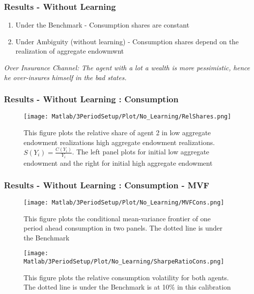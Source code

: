 \documentclass{beamer}
\theoremstyle{Definition}
\begin{document}
\begin{frame}
\frametitle{Results - Without Learning}
\begin{enumerate}	
\item Under the Benchmark - Consumption shares are constant
\item Under Ambiguity (without learning) - Consumption shares depend
  on the realization of aggregate endowmwnt

\end{enumerate}

\emph{Over Insurance Channel: The agent with a lot a wealth is more
pessimistic, hence he over-insures himself in the bad states. }

	
\end{frame}

\begin{frame}

\frametitle{Results - Without Learning : Consumption }
\begin{figure}[htbp]
\centering
	  \texttt{[image: Matlab/3PeriodSetup/Plot/No\_Learning/RelShares.png]}

	\caption{This figure plots the relative share of agent 2 in low aggregate endowment realizations high aggregate endowment realizations. $S(Y_i)=\frac{C(Y_i)}{Y_i}$. The left panel plots for initial low aggregate endowment and the right for initial high aggregate endowment}
	\label{fig:RelShares}
\end{figure}
	
\end{frame}


\begin{frame}
\frametitle{Results - Without Learning : Consumption - MVF }
\begin{figure}[htbp]
\centering
	  \texttt{[image: Matlab/3PeriodSetup/Plot/No\_Learning/MVFCons.png]}

	\caption{This figure plots the conditional mean-variance frontier of one period ahead consumption in two panels. The dotted line is under the Benchmark }
	\label{fig:MVFCons}
\end{figure}
\end{frame}
\begin{frame}
\begin{figure}[htbp]
\centering
	  \texttt{[image: Matlab/3PeriodSetup/Plot/No\_Learning/SharpeRatioCons.png]}

	\caption{This figure plots the relative consumption volatility for both agents. The dotted line is under the Benchmark is at 10\% in this calibration}
	\label{fig:SharpeRatioCons}
	\end{figure}
\end{frame}
\end{document}
